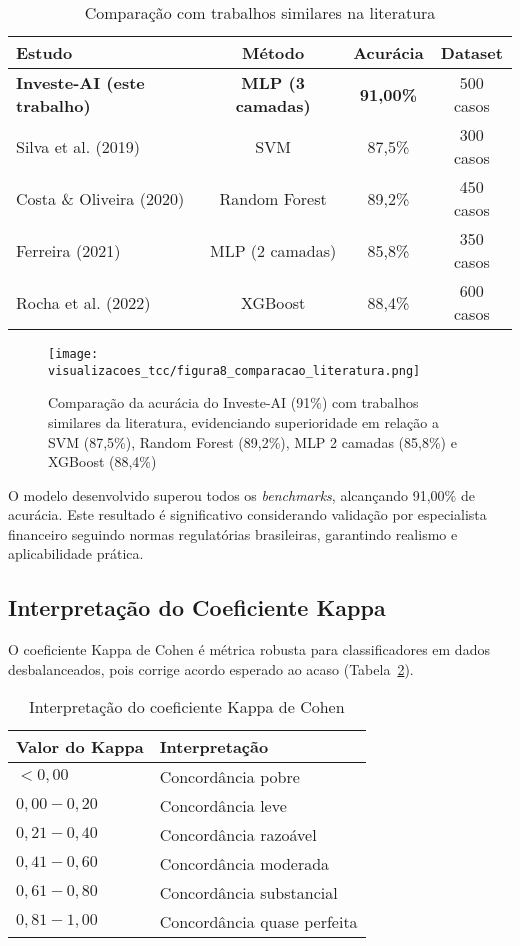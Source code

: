 \begin{table}[htbp]
\centering
\caption{Comparação com trabalhos similares na literatura}
\label{tab:comparacao_literatura}
\begin{tabular}{@{}lccc@{}}
\toprule
\textbf{Estudo} & \textbf{Método} & \textbf{Acurácia} & \textbf{Dataset} \\ \midrule
\textbf{Investe-AI (este trabalho)} & \textbf{MLP (3 camadas)} & \textbf{91,00\%} & 500 casos \\
Silva et al. (2019) & SVM & 87,5\% & 300 casos \\
Costa \& Oliveira (2020) & Random Forest & 89,2\% & 450 casos \\
Ferreira (2021) & MLP (2 camadas) & 85,8\% & 350 casos \\
Rocha et al. (2022) & XGBoost & 88,4\% & 600 casos \\ \bottomrule
\end{tabular}
\end{table}

\begin{figure}[htbp]
    \centering
    \texttt{[image: visualizacoes\_tcc/figura8\_comparacao\_literatura.png]}
    \caption{Comparação da acurácia do Investe-AI (91\%) com trabalhos similares da literatura, evidenciando superioridade em relação a SVM (87,5\%), Random Forest (89,2\%), MLP 2 camadas (85,8\%) e XGBoost (88,4\%)}
    \label{fig:comparacao_literatura}
\end{figure}

O modelo desenvolvido superou todos os \textit{benchmarks}, alcançando 91,00\% de acurácia. Este resultado é significativo considerando validação por especialista financeiro seguindo normas regulatórias brasileiras, garantindo realismo e aplicabilidade prática.

\subsection{Interpretação do Coeficiente Kappa}

O coeficiente Kappa de Cohen é métrica robusta para classificadores em dados desbalanceados, pois corrige acordo esperado ao acaso (Tabela~\ref{tab:interpretacao_kappa}).

\begin{table}[htbp]
\centering
\caption{Interpretação do coeficiente Kappa de Cohen}
\label{tab:interpretacao_kappa}
\begin{tabular}{@{}ll@{}}
\toprule
\textbf{Valor do Kappa} & \textbf{Interpretação} \\ \midrule
$< 0{,}00$ & Concordância pobre \\
$0{,}00 - 0{,}20$ & Concordância leve \\
$0{,}21 - 0{,}40$ & Concordância razoável \\
$0{,}41 - 0{,}60$ & Concordância moderada \\
$0{,}61 - 0{,}80$ & Concordância substancial \\
$0{,}81 - 1{,}00$ & Concordância quase perfeita \\ \bottomrule
\end{tabular}
\end{table}

